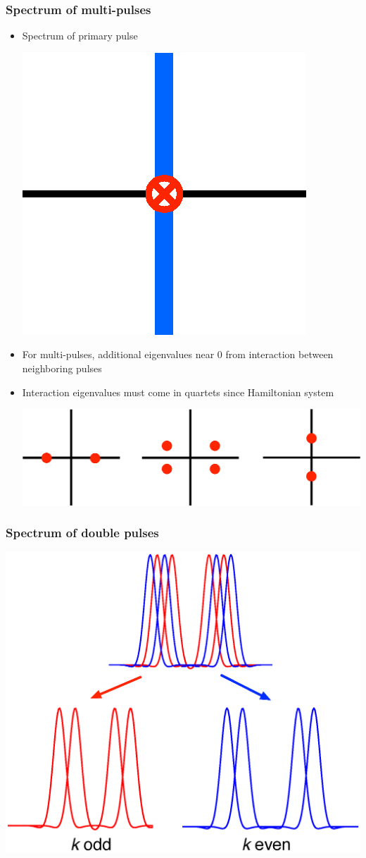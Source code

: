 \documentclass[16pt]{beamer}
\begin{document}
\begin{frame}
	\frametitle{Spectrum of multi-pulses}
	\fontsize{16}{7.2}\selectfont
	\begin{itemize}
	\item Spectrum of primary pulse
		\begin{center}
			\includegraphics[width=0.2\linewidth]{images/eigsinglepulse.eps}
		\end{center}
	\item For multi-pulses, additional eigenvalues near 0 from interaction between neighboring pulses 
	\fontsize{16}{7.2}\selectfont
	\item Interaction eigenvalues must come in quartets since Hamiltonian system
		\begin{center}
			\includegraphics[width=0.8\linewidth]{images/eigdouble2}
		\end{center}
	\end{itemize}
\end{frame}

\begin{frame}
	\frametitle{Spectrum of double pulses}
	\begin{center}
		\includegraphics[width=0.8\linewidth]{images/dpsplit}
	\end{center}
\end{frame}
\end{document}
